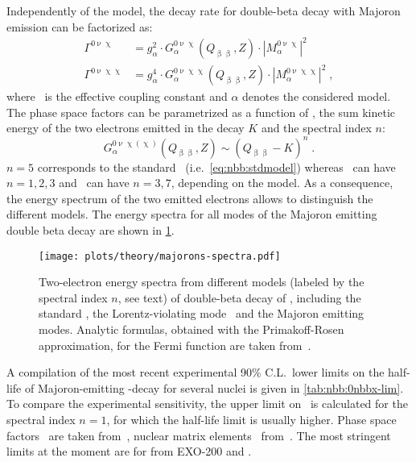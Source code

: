 Independently of the model, the decay rate for double-beta decay with Majoron emission can
be factorized as:
\begin{align*}
  \Gamma^{0\upnu\upchi}  &= g_\alpha^2 \cdot G_\alpha^{0\upnu\upchi}(Q_{\upbeta\upbeta}, Z)
    \cdot |M_\alpha^{0\upnu\upchi}|^2 \\
  \Gamma^{0\upnu\upchi\upchi} &= g_\alpha^4 \cdot G_\alpha^{0\upnu\upchi\upchi}(Q_{\upbeta\upbeta}, Z)
    \cdot |M_\alpha^{0\upnu\upchi\upchi}|^2 \;,
\end{align*}
where \ga\ is the effective coupling constant and $\alpha$ denotes the considered
model. The phase space factors can be parametrized as a function of \qbb, the sum kinetic
energy of the two electrons emitted in the decay $K$ and the spectral index $n$:
\[
  G_\alpha^{0\upnu\upchi(\upchi)}(Q_{\upbeta\upbeta}, Z)
    \sim {(Q_{\upbeta\upbeta} - K)}^n \;.
\]
$n = 5$ corresponds to the standard \nnbb\ (i.e.~\cref{eq:nbb:stdmodel}) whereas \onbbx\
can have $n = 1, 2, 3$ and \onbbxx\ can have $n = 3, 7$, depending on the model. As a
consequence, the energy spectrum of the two emitted electrons allows to distinguish the
different models. The energy spectra for all modes of the Majoron emitting double beta
decay are shown in \cref{fig:nbb:majorons-spectra}.

%   

\begin{figure}
  \centering
  \texttt{[image: plots/theory/majorons-spectra.pdf]}
  \caption{%
    Two-electron energy spectra from different models (labeled by the spectral index $n$,
    see text) of double-beta decay of \gesix, including the standard \nnbb, the
    Lorentz-violating mode \nnbblv\ and the Majoron emitting modes.  Analytic formulas,
    obtained with the Primakoff-Rosen approximation, for the Fermi function are taken
    from~\cite{Tretyak1995, Tretyak2002}.
  }\label{fig:nbb:majorons-spectra}
\end{figure}

A compilation of the most recent experimental 90\% C.L.~lower limits on the half-life of
Majoron-emitting \onbb-decay for several nuclei is given in \cref{tab:nbb:0nbbx-lim}. To
compare the experimental sensitivity, the upper limit on \ga\ is calculated for the spectral
index $n=1$, for which the half-life limit is usually higher. Phase space factors
\psfmajo\ are taken from~\cite{Kotila2015}, nuclear matrix elements \nmemajo\
from~\cite{Engel2017}. The most stringent limits at the moment are for  from
EXO-200 and \kamlandzen.

